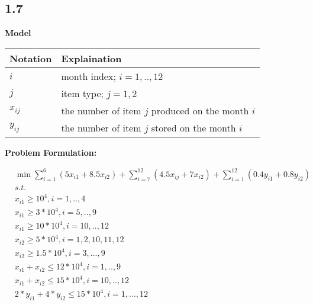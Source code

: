 \documentclass[11pt]{article}
\begin{document}
    \hypertarget{section}{%
\subsection{1.7}\label{section}}

\textbf{Model}

\begin{longtable}[]{@{}ll@{}}
\toprule
Notation & Explaination\tabularnewline
\midrule
\endhead
\(i\) & month index; \(i=1,..,12\)\tabularnewline
\(j\) & item type; \(j=1,2\)\tabularnewline
\(x_{ij}\) & the number of item \(j\) produced on the month
\(i\)\tabularnewline
\(y_{ij}\) & the number of item \(j\) stored on the month
\(i\)\tabularnewline
\bottomrule
\end{longtable}

\textbf{Problem Formulation:}

\[
\begin{align*}
    & \min \sum_{i=1}^6 (5x_{i1} +8.5 x_{i2}) + \sum_{i=7}^{12} (4.5x_{ij} +  7x_{i2}) + \sum_{i=1}^{12} (0.4 y_{i1} + 0.8y_{i2})\\
    & s.t. \\
    & x_{i1}\geq 10^4, i=1,..,4 \\
    & x_{i1}\geq 3*10^4, i=5,..,9 \\
    & x_{i1}\geq 10*10^4, i=10,..,12 \\
    & x_{i2} \geq 5*10^4, i=1,2,10,11,12\\
    & x_{i2} \geq 1.5*10^4, i=3,...,9 \\
    & x_{i1} + x_{i2} \leq 12*10^4, i=1,..,9 \\
    & x_{i1} + x_{i2} \leq 15*10^4, i=10,..,12 \\ 
    & 2 * y_{i1} + 4 * y_{i2} \leq 15 * 10^4, i=1,...,12
 \end{align*}
\]
\end{document}
